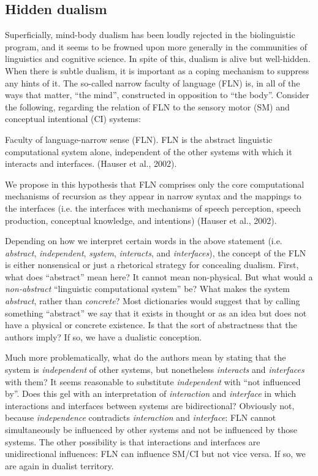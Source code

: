 \subsection{Hidden dualism}

Superficially, mind-body dualism has been loudly rejected in the biolinguistic program, and it seems to be frowned upon more generally in the communities of linguistics and cognitive science. In spite of this, dualism is alive but well-hidden. When there is subtle dualism, it is important as a coping mechanism to suppress any hints of it. The so-called narrow faculty of language (FLN) is, in all of the ways that matter, “the mind”, constructed in opposition to “the body”. Consider the following, regarding the relation of FLN to the sensory motor (SM) and conceptual intentional (CI) systems:

Faculty of language-narrow sense (FLN). FLN is the abstract linguistic computational system alone, independent of the other systems with which it interacts and interfaces. (Hauser et al., 2002).

We   propose   in   this   hypothesis   that   FLN   comprises   only   the   core computational  mechanisms  of  recursion  as  they  appear  in  narrow  syntax  and  the mappings  to  the  interfaces (i.e.  the  interfaces  with  mechanisms  of  speech  perception, speech  production,  conceptual  knowledge,  and  intentions) (Hauser et al., 2002).

  Depending on how we interpret certain words in the above statement (i.e. \textit{abstract}, \textit{independent}, \textit{system}, \textit{interacts}, and \textit{interfaces}), the concept of the FLN is either nonsensical or just a rhetorical strategy for concealing dualism. First, what does “abstract” mean here? It cannot mean non-physical. But what would a \textit{non-abstract} “linguistic computational system” be? What makes the system \textit{abstract}, rather than \textit{concrete}? Most dictionaries would suggest that by calling something “abstract” we say that it exists in thought or as an idea but does not have a physical or concrete existence. Is that the sort of abstractness that the authors imply? If so, we have a dualistic conception. 

  Much more problematically, what do the authors mean by stating that the system is \textit{independent} of other systems, but nonetheless \textit{interacts} and \textit{interfaces} with them? It seems reasonable to substitute \textit{independent} with “not influenced by”. Does this gel with an interpretation of \textit{interaction} and \textit{interface} in which interactions and interfaces between systems are bidirectional? Obviously not, because \textit{independence} contradicts \textit{interaction} and \textit{interface}: FLN cannot simultaneously be influenced by other systems and not be influenced by those systems. The other possibility is that interactions and interfaces are unidirectional influences: FLN can influence SM/CI but not vice versa. If so, we are again in dualist territory. 

